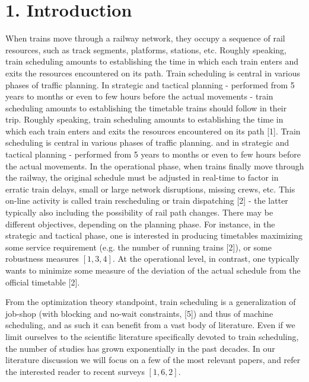 \documentclass[10pt]{article}
\begin{document}
\section*{1. Introduction}
When trains move through a railway network, they occupy a sequence of rail resources, such as track segments, platforms, stations, etc. Roughly speaking, train scheduling amounts to establishing the time in which each train enters and exits the resources encountered on its path. Train scheduling is central in various phases of traffic planning. In strategic and tactical planning - performed from 5 years to months or even to few hours before the actual movements - train scheduling amounts to establishing the timetable trains should follow in their trip. Roughly speaking, train scheduling amounts to establishing the time in which each train enters and exits the resources encountered on its path [1]. Train scheduling is central in various phases of traffic planning. and in strategic and tactical planning - performed from 5 years to months or even to few hours before the actual movements. In the operational phase, when trains finally move through the railway, the original schedule must be adjusted in real-time to factor in erratic train delays, small or large network disruptions, missing crews, etc. This on-line activity is called train rescheduling or train dispatching [2] - the latter typically also including the possibility of rail path changes. There may be different objectives, depending on the planning phase. For instance, in the strategic and tactical phase, one is interested in producing timetables maximizing some service requirement (e.g. the number of running trains [2]), or some robustness measures $[1,3,4]$. At the operational level, in contrast, one typically wants to minimize some measure of the deviation of the actual schedule from the official timetable [2].

From the optimization theory standpoint, train scheduling is a generalization of job-shop (with blocking and no-wait constraints, [5]) and thus of machine scheduling, and as such it can benefit from a vast body of literature. Even if we limit ourselves to the scientific literature specifically devoted to train scheduling, the number of studies has grown exponentially in the past decades. In our literature discussion we will focus on a few of the most relevant papers, and refer the interested reader to recent surveys $[1,6,2]$.
\end{document}
